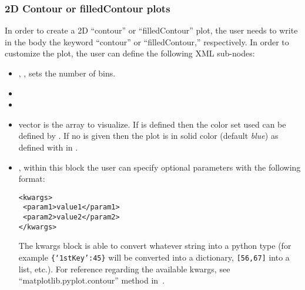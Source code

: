 \subsubsection{2D Contour or filledContour plots}
In order to create a 2D ``contour'' or ``filledContour'' plot, the user needs to
write in the  body the keyword ``contour'' or ``filledContour,''
respectively.
%
In order to customize the plot, the user can define the following XML sub-nodes:
\begin{itemize}
  \item {}, , sets the 
  number of bins.
  \item {}
  \item {}
  \item {} vector is the array to visualize.  If  is defined then the color set used can be defined by . 
  If no  is given then the plot is in solid color (default \textit{blue}) as defined with  in .
  \item {}, within this block the user can specify optional
  parameters with the following format:

\begin{lstlisting}[style=XML]
<kwargs>
 <param1>value1</param1>
 <param2>value2</param2>
</kwargs>
\end{lstlisting}

  The kwargs block is able to convert whatever string into a python type (for
  example  \texttt{\{`1stKey':45\}} will
  be converted into a dictionary, 
   \texttt{[56,67]}  into a list, etc.).
  For reference regarding the available kwargs, see
  ``matplotlib.pyplot.contour'' method in~\cite{MatPlotLib}.
    \end{itemize}

